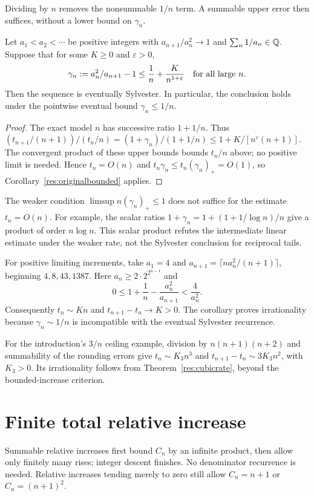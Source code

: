 \documentclass[11pt]{article}
\begin{document}
Dividing by $n$ removes the nonsummable $1/n$ term. A summable upper
error then suffices, without a lower bound on $\gamma_n$.
\begin{corollary}\label{res:inclusiveone}
Let $a_1<a_2<\cdots$ be positive integers with $a_{n+1}/a_n^2\to1$
and $\sum_n1/a_n\in\mathbb{Q}$. Suppose that for some $K\ge0$ and $\varepsilon>0$,
\[
 \gamma_n:=a_n^2/a_{n+1}-1\le \frac1n+\frac{K}{n^{1+\varepsilon}}
 \quad\hbox{for all large }n.
\]
Then the sequence is eventually Sylvester. In particular, the conclusion
holds under the pointwise eventual bound $\gamma_n\le1/n$.
\end{corollary}
\begin{proof}
The exact model $n$ has successive ratio $1+1/n$. Thus
$(t_{n+1}/(n+1))/(t_n/n)=(1+\gamma_n)/(1+1/n)
\le1+K/[n^\varepsilon(n+1)]$.
The convergent product of these upper bounds bounds $t_n/n$ above;
no positive limit is needed. Hence $t_n=O(n)$ and
$t_n\gamma_n\le t_n(\gamma_n)_+=O(1)$, so
Corollary~\ref{res:originalbounded} applies.
\end{proof}

The weaker condition $\limsup n(\gamma_n)_+\le1$ does not suffice
for the estimate $t_n=O(n)$. For example, the scalar ratios
$1+\gamma_n=1+(1+1/\log n)/n$ give a product of order $n\log n$.
This scalar product refutes the intermediate linear estimate under
the weaker rate, not the Sylvester conclusion for reciprocal tails.

For positive limiting increments, take
$a_1=4$ and $a_{n+1}=\lceil n a_n^2/(n+1)\rceil$, beginning
$4,8,43,1387$. Here $a_n\ge2\cdot2^{2^{n-1}}$ and
\[
 0\le1+\frac1n-\frac{a_n^2}{a_{n+1}}<\frac4{a_n^2}.
\]
Consequently $t_n\sim K n$ and $t_{n+1}-t_n\to K>0$.
The corollary proves irrationality because $\gamma_n\sim1/n$ is
incompatible with the eventual Sylvester recurrence.

For the introduction's $3/n$ ceiling example, division by
$n(n+1)(n+2)$ and summability of the rounding errors give
$t_n\sim K_3n^3$ and $t_{n+1}-t_n\sim3K_3n^2$, with $K_3>0$.
Its irrationality follows from Theorem~\ref{res:cubicrate}, beyond the
bounded-increase criterion.
\section{Finite total relative increase}\label{sec:mass}
Summable relative increases first bound $C_n$ by an infinite product,
then allow only finitely many rises; integer descent finishes.
No denominator recurrence is needed. Relative increases tending merely
to zero still allow $C_n=n+1$ or $C_n=(n+1)^2$.
\end{document}
